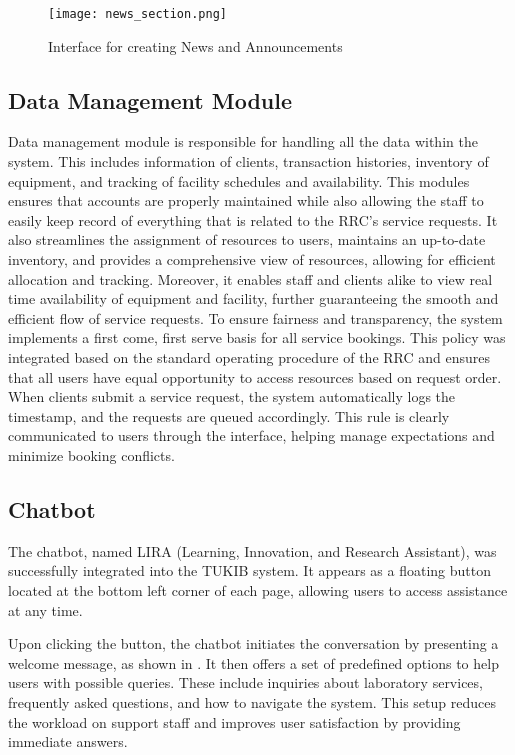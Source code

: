 \begin{figure}[h]
    \centering
    \texttt{[image: news\_section.png]}
    \caption{Interface for creating News and Announcements}
    \label{fig:announcements}
\end{figure}

\newpage

\subsection{Data Management Module}

Data management module is responsible for handling all the data within the system. This includes information of clients, transaction histories, inventory of equipment, and tracking of facility schedules and availability. This modules ensures that accounts are properly maintained while also allowing the staff to easily keep record of everything that is related to the RRC's service requests. It also streamlines the assignment of resources to users, maintains an up-to-date inventory, and provides a comprehensive view of resources, allowing for efficient allocation and tracking. Moreover, it enables staff and clients alike to view real time availability of equipment and facility, further guaranteeing the smooth and efficient flow of  service requests. To ensure fairness and transparency, the system implements a first come, first serve basis for all service bookings. This policy was integrated based on the standard operating procedure of the RRC and ensures that all users have equal opportunity to access resources based on request order. When clients submit a service request, the system automatically logs the timestamp, and the requests are queued accordingly. This rule is clearly communicated to users through the interface, helping manage expectations and minimize booking conflicts.

\subsection{Chatbot}

The chatbot, named LIRA (Learning, Innovation, and Research Assistant), was successfully integrated into the TUKIB system. It appears as a floating button located at the bottom left corner of each page, allowing users to access assistance at any time.

Upon clicking the button, the chatbot initiates the conversation by presenting a welcome message, as shown in . It then offers a set of predefined options to help users with possible queries. These include inquiries about laboratory services, frequently asked questions, and how to navigate the system. This setup reduces the workload on support staff and improves user satisfaction by providing immediate answers.

